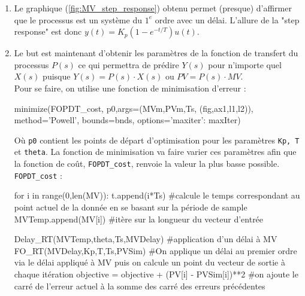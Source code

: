 \documentclass{article}
\begin{document}
\begin{enumerate}
    \item Le graphique (\ref{fig:MV_step_response}) obtenu permet (presque) d'affirmer que le processus est un système du $1^{e}$ ordre avec un délai. L'allure de la "step response" est donc $y(t) = K_p (1-e^{-t/T})u(t)$.

    \item Le but est maintenant d'obtenir les paramètres de la fonction de transfert du processus $P(s)$ ce qui permettra de prédire $Y(s)$ pour n'importe quel $X(s)$ puisque $Y(s) = P(s) \cdot X(s)$ ou $PV = P(s)\cdot MV$. 
    \\Pour se faire, on utilise une fonction de minimisation d'erreur : 
    \begin{python*}
        minimize(FOPDT_cost,
            p0,args=(MVm,PVm,Ts,
            (fig,ax1,l1,l2)), 
            method='Powell',
            bounds=bnds,
            options={'maxiter': maxIter})
    \end{python*}

    Où \texttt{p0} contient les points de départ d'optimisation pour les paramètres \texttt{Kp, T} et \texttt{theta}. La fonction de minimisation va faire varier ces paramètres afin que la fonction de coût, \texttt{FOPDT\_cost}, renvoie la valeur la plus basse possible. 
    \\ \texttt{FOPDT\_cost} : 

    \begin{python*}
        for i in range(0,len(MV)):
            t.append(i*Ts) #calcule le temps correspondant au point actuel                  de la donnée en se basant sur la période de sample
            MVTemp.append(MV[i]) #itère sur la longueur du vecteur d'entrée

            Delay_RT(MVTemp,theta,Ts,MVDelay) #application d'un délai à MV  
            FO_RT(MVDelay,Kp,T,Ts,PVSim) #On applique un délai au premier ordre via le délai appliqué à MV puis on calcule un point du vecteur de sortie à chaque itération 
            objective = objective + (PV[i] - PVSim[i])**2 #on ajoute le carré de l'erreur actuel à la somme des carré des erreurs précédentes   
    \end{python*}
\end{enumerate}
\end{document}
